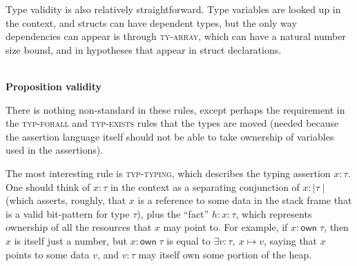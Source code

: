 \documentclass[acmsmall,nonacm]{acmart}
\newcommand*{\N}{\mathbb{N}}
\newcommand{\wand}{\mathrel{-\!\!\ast}}
\newcommand{\core}[1]{{\mid}#1{\mid}}
\newcommand{\proves}{\vdash}
\newcommand{\judgment}[2][]{\noindent\\\textbf{#1}\hspace{\stretch{1}}\fbox{$#2$}\nopagebreak}
\newcommand*{\axiom}[2][]{\infer[#1]{}{#2}}
\begin{document}
Type validity is also relatively straightforward. Type variables are looked up in the context, and structs can have dependent types, but the only way dependencies can appear is through \textsc{ty-array}, which can have a natural number size bound, and in hypotheses that appear in struct declarations.

\judgment[Proposition validity]{\Gamma \proves A\;\mathsf{prop}}

There is nothing non-standard in these rules, except perhaps the requirement in the \textsc{typ-forall} and \textsc{typ-exists} rules that the types are moved (needed because the assertion language itself should not be able to take ownership of variables used in the assertions).

The most interesting rule is \textsc{typ-typing}, which describes the typing assertion $\boxed{x:\tau}$. One should think of $x:\tau$ in the context as a separating conjunction of $x:\core\tau$ (which asserts, roughly, that $x$ is a reference to some data in the stack frame that is a valid bit-pattern for type $\tau$), plus the ``fact'' $h:\boxed{x:\tau}$, which represents ownership of all the resources that $x$ may point to. For example, if $x:\mathsf{own}\;\tau$, then $x$ is itself just a number, but $\boxed{x:\mathsf{own}\;\tau}$ is equal to $\exists v:\tau,\ x\mapsto v$, saying that $x$ points to some data $v$, and $v:\tau$ may itself own some portion of the heap.
\end{document}
